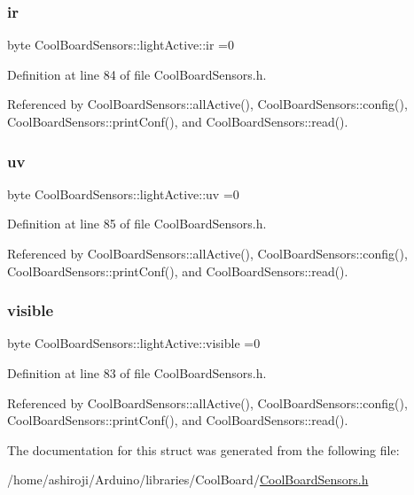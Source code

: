 \subsubsection{\texorpdfstring{ir}{ir}}
{\footnotesize\ttfamily byte Cool\+Board\+Sensors\+::light\+Active\+::ir =0}



Definition at line 84 of file Cool\+Board\+Sensors.\+h.



Referenced by Cool\+Board\+Sensors\+::all\+Active(), Cool\+Board\+Sensors\+::config(), Cool\+Board\+Sensors\+::print\+Conf(), and Cool\+Board\+Sensors\+::read().

\mbox{\label{structCoolBoardSensors_1_1lightActive_a949a7aaf5166d981de8fe0fd93da20d6}} 
\subsubsection{\texorpdfstring{uv}{uv}}
{\footnotesize\ttfamily byte Cool\+Board\+Sensors\+::light\+Active\+::uv =0}



Definition at line 85 of file Cool\+Board\+Sensors.\+h.



Referenced by Cool\+Board\+Sensors\+::all\+Active(), Cool\+Board\+Sensors\+::config(), Cool\+Board\+Sensors\+::print\+Conf(), and Cool\+Board\+Sensors\+::read().

\mbox{\label{structCoolBoardSensors_1_1lightActive_abcbba296b6a95e67c0cd2555d9dd50c7}} 
\subsubsection{\texorpdfstring{visible}{visible}}
{\footnotesize\ttfamily byte Cool\+Board\+Sensors\+::light\+Active\+::visible =0}



Definition at line 83 of file Cool\+Board\+Sensors.\+h.



Referenced by Cool\+Board\+Sensors\+::all\+Active(), Cool\+Board\+Sensors\+::config(), Cool\+Board\+Sensors\+::print\+Conf(), and Cool\+Board\+Sensors\+::read().



The documentation for this struct was generated from the following file\+:\begin{DoxyCompactItemize}
\item 
/home/ashiroji/\+Arduino/libraries/\+Cool\+Board/\hyperlink{CoolBoardSensors_8h}{Cool\+Board\+Sensors.\+h}\end{DoxyCompactItemize}
